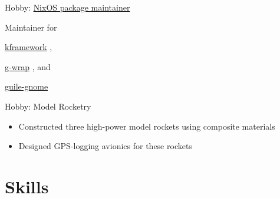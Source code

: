 \documentclass[10pt,letterpaper,sans]{moderncv}
\newcommand{\wlink}[2]{\textcolor[HTML]{0071E6}{\href{#1}{#2}}}
\newcommand{\nixpkg}[2]{
  \wlink{https://github.com/NixOS/nixpkgs/tree/master/pkgs/#1/#2/default.nix}%
        {#2}%
}
\newcommand{\ghlink}[2]{\wlink{https://github.com/#1}{#2}}
\newcommand{\ghlang}[1]{\texttt{#1}}
\newcommand{\ghcom}[1]{\textcolor[HTML]{666666}{#1}}
\newcommand{\ghadd}[1]{\textcolor[HTML]{6CC644}{+ #1}}
\newcommand{\ghrem}[1]{\textcolor[HTML]{BD2C00}{- #1}}
\newcommand{\ghtr}[0]{Repo}
\newcommand{\ghtf}[0]{Fork}
\newcommand{\ghtable}[6]{#1 & #2 & #3 & #4 & #5 & #6 \\}
\newcommand{\ghr}[9]{
  \ghtable{\ghtr{}}
          {\ghlink{#1/#2}{#2}}
          {\ghlang{#3}}
          {\ghcom{#4}}
          {\ghadd{#5}}
          {\ghrem{#6}}%
}
\newcommand{\ghf}[9]{
  \ghtable{\ghtf{}}
          {\ghlink{#1/#2}{#2}}
          {\ghlang{#3}}
          {\ghcom{#4}}
          {\ghadd{#5}}
          {\ghrem{#6}}%
}
\begin{document}
{\begin{tabular}{l l l l l l}
  \midrule
\end{tabular}
}

        {Hobby: \href{http://nixos.org}{NixOS package maintainer}}
        {}{}{}{
Maintainer for%
\nixpkg{applications/science/programming}{kframework},%
\nixpkg{development/tools/guile}{g-wrap}, and %
\nixpkg{development/tools/guile-modules}{guile-gnome}%
}

        {Hobby: Model Rocketry}
        {}{}{}{
  \begin{itemize}
  \item Constructed three high-power model rockets using composite materials
  \item Designed GPS-logging avionics for these rockets
  \end{itemize}
}

\section{Skills}

\newpage
\end{document}
